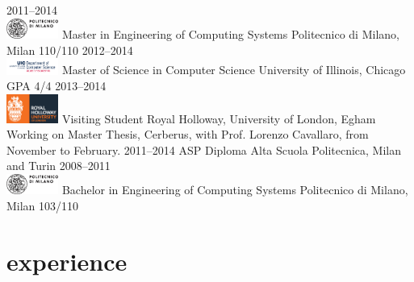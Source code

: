 \documentclass[]{friggeri-cv} %
\begin{document}
\begin{entrylist}
\entry
{2011--2014\\
\includegraphics[width=1.7cm]{img/logo_polimi.eps}}
{Master {\normalfont in Engineering of Computing Systems}}
{Politecnico di Milano, Milan}
{110/110}
\entry
{2012--2014\\
\includegraphics[width=1.7cm]{img/logo_uic.pdf}}
{Master of Science {\normalfont in Computer Science}}
{University of Illinois, Chicago}
{GPA 4/4}
\entry
{2013--2014\\
\includegraphics[width=1.7cm]{img/logo_rhul.eps}}
{Visiting Student}
{Royal Holloway, University of London, Egham}
{Working on Master Thesis, Cerberus, with Prof. Lorenzo Cavallaro, from November to February.}
\entry
{2011--2014}
{ASP Diploma}
{Alta Scuola Politecnica, Milan and Turin}
{}
\entry
{2008--2011\\
\includegraphics[width=1.7cm]{img/logo_polimi.eps}}
{Bachelor {\normalfont in Engineering of Computing Systems}}
{Politecnico di Milano, Milan}
{103/110}

\end{entrylist}


\section{experience}
\end{document}
